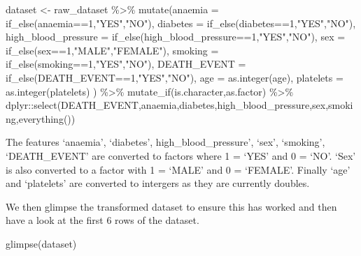 \documentclass[
]{article}
\newenvironment{Shaded}{\begin{snugshade}}{\end{snugshade}}
\newcommand{\AttributeTok}[1]{\textcolor[rgb]{0.77,0.63,0.00}{#1}}
\newcommand{\DecValTok}[1]{\textcolor[rgb]{0.00,0.00,0.81}{#1}}
\newcommand{\FunctionTok}[1]{\textcolor[rgb]{0.00,0.00,0.00}{#1}}
\newcommand{\NormalTok}[1]{#1}
\newcommand{\OtherTok}[1]{\textcolor[rgb]{0.56,0.35,0.01}{#1}}
\newcommand{\SpecialCharTok}[1]{\textcolor[rgb]{0.00,0.00,0.00}{#1}}
\newcommand{\StringTok}[1]{\textcolor[rgb]{0.31,0.60,0.02}{#1}}
\begin{document}
\begin{Shaded}
\begin{Highlighting}[]
\NormalTok{dataset }\OtherTok{\textless{}{-}}\NormalTok{ raw\_dataset }\SpecialCharTok{\%\textgreater{}\%}
  \FunctionTok{mutate}\NormalTok{(}\AttributeTok{anaemia =} \FunctionTok{if\_else}\NormalTok{(anaemia}\SpecialCharTok{==}\DecValTok{1}\NormalTok{,}\StringTok{"YES"}\NormalTok{,}\StringTok{"NO"}\NormalTok{),}
         \AttributeTok{diabetes =} \FunctionTok{if\_else}\NormalTok{(diabetes}\SpecialCharTok{==}\DecValTok{1}\NormalTok{,}\StringTok{"YES"}\NormalTok{,}\StringTok{"NO"}\NormalTok{),}
         \AttributeTok{high\_blood\_pressure =} \FunctionTok{if\_else}\NormalTok{(high\_blood\_pressure}\SpecialCharTok{==}\DecValTok{1}\NormalTok{,}\StringTok{"YES"}\NormalTok{,}\StringTok{"NO"}\NormalTok{),}
         \AttributeTok{sex =} \FunctionTok{if\_else}\NormalTok{(sex}\SpecialCharTok{==}\DecValTok{1}\NormalTok{,}\StringTok{"MALE"}\NormalTok{,}\StringTok{"FEMALE"}\NormalTok{),}
         \AttributeTok{smoking =} \FunctionTok{if\_else}\NormalTok{(smoking}\SpecialCharTok{==}\DecValTok{1}\NormalTok{,}\StringTok{"YES"}\NormalTok{,}\StringTok{"NO"}\NormalTok{),}
         \AttributeTok{DEATH\_EVENT =} \FunctionTok{if\_else}\NormalTok{(DEATH\_EVENT}\SpecialCharTok{==}\DecValTok{1}\NormalTok{,}\StringTok{"YES"}\NormalTok{,}\StringTok{"NO"}\NormalTok{),}
         \AttributeTok{age =} \FunctionTok{as.integer}\NormalTok{(age),}
         \AttributeTok{platelets =} \FunctionTok{as.integer}\NormalTok{(platelets)}
\NormalTok{  ) }\SpecialCharTok{\%\textgreater{}\%}
  \FunctionTok{mutate\_if}\NormalTok{(is.character,as.factor) }\SpecialCharTok{\%\textgreater{}\%}
\NormalTok{  dplyr}\SpecialCharTok{::}\FunctionTok{select}\NormalTok{(DEATH\_EVENT,anaemia,diabetes,high\_blood\_pressure,sex,smoking,}\FunctionTok{everything}\NormalTok{())}
\end{Highlighting}
\end{Shaded}

The features `anaemia', `diabetes', high\_blood\_pressure', `sex',
`smoking', `DEATH\_EVENT' are converted to factors where 1 = `YES' and 0
= `NO'. `Sex' is also converted to a factor with 1 = `MALE' and 0 =
`FEMALE'. Finally `age' and `platelets' are converted to intergers as
they are currently doubles.

We then glimpse the transformed dataset to ensure this has worked and
then have a look at the first 6 rows of the dataset.

\begin{Shaded}
\begin{Highlighting}[]
\FunctionTok{glimpse}\NormalTok{(dataset)}
\end{Highlighting}
\end{Shaded}
\end{document}
